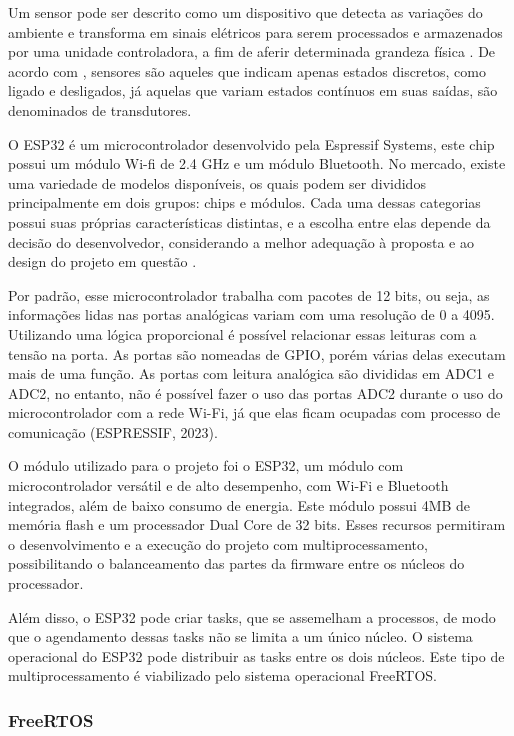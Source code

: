\documentclass[%
  article,%
  a4paper,%
  12pt,%
  fleqn,%
  oneside,%
  chapter = TITLE,%
  section = TITLE,%
]{abntex2}
\begin{document}
Um sensor pode ser descrito como um dispositivo que detecta as variações do ambiente e transforma em sinais elétricos para serem processados e armazenados por uma unidade controladora, a fim de aferir determinada grandeza física \cite{akabane2018gestao}. De acordo com \citet{alcatorre2014introducao}, sensores são aqueles que indicam apenas estados discretos, como ligado e desligados, já aquelas que variam estados contínuos em suas saídas, são denominados de transdutores.

O ESP32 é um microcontrolador desenvolvido pela Espressif Systems, este chip possui um módulo Wi-fi de 2.4 GHz e um módulo Bluetooth. No mercado, existe uma variedade de modelos disponíveis, os quais podem ser divididos principalmente em dois grupos: chips e módulos. Cada uma dessas categorias possui suas próprias características distintas, e a escolha entre elas depende da decisão do desenvolvedor, considerando a melhor adequação à proposta e ao design do projeto em questão \cite{Kurniawan2019}.

Por padrão, esse microcontrolador trabalha com pacotes de 12 bits, ou seja, as informações lidas nas portas analógicas variam com uma resolução de 0 a 4095. Utilizando uma lógica proporcional é possível relacionar essas leituras com a tensão na porta. As portas são nomeadas de GPIO, porém várias delas executam mais de uma função. As portas com leitura analógica são divididas em ADC1 e ADC2, no entanto, não é possível fazer o uso das portas ADC2 durante o uso do microcontrolador com a rede Wi-Fi, já que elas ficam ocupadas com processo de comunicação (ESPRESSIF, 2023).

O módulo utilizado para o projeto foi o ESP32, um módulo com microcontrolador versátil e de alto desempenho, com Wi-Fi e Bluetooth integrados, além de baixo consumo de energia. Este módulo possui 4MB de memória flash e um processador Dual Core de 32 bits. Esses recursos permitiram o desenvolvimento e a execução do projeto com multiprocessamento, possibilitando o balanceamento das partes da firmware entre os núcleos do processador.

Além disso, o ESP32 pode criar tasks, que se assemelham a processos, de modo que o agendamento dessas tasks não se limita a um único núcleo. O sistema operacional do ESP32 pode distribuir as tasks entre os dois núcleos. Este tipo de multiprocessamento é viabilizado pelo sistema operacional FreeRTOS.


\subsubsection{FreeRTOS }
\end{document}
